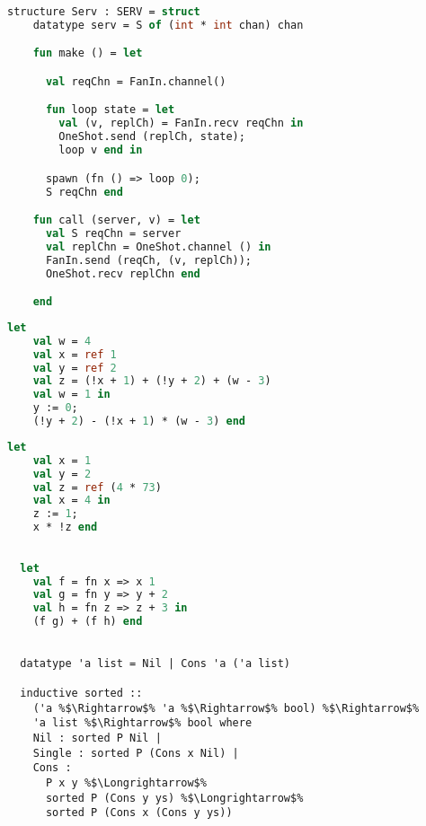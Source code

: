 \documentclass{article}
\begin{document}
\begin{lstlisting}[language=ML, style=codestyle1]
  structure Serv : SERV = struct 
    datatype serv = S of (int * int chan) chan 

    fun make () = let 

      val reqChn = FanIn.channel()

      fun loop state = let
        val (v, replCh) = FanIn.recv reqChn in 
        OneShot.send (replCh, state);
        loop v end in

      spawn (fn () => loop 0);
      S reqChn end 

    fun call (server, v) = let 
      val S reqChn = server
      val replChn = OneShot.channel () in 
      FanIn.send (reqCh, (v, replCh));
      OneShot.recv replChn end

    end
  \end{lstlisting}

\begin{lstlisting}[language=ML, style=codestyle1]
  let
    val w = 4
    val x = ref 1
    val y = ref 2
    val z = (!x + 1) + (!y + 2) + (w - 3)
    val w = 1 in
    y := 0;
    (!y + 2) - (!x + 1) * (w - 3) end
  \end{lstlisting}

\begin{lstlisting}[language=ML, style=codestyle1]
  let 
    val x = 1  
    val y = 2
    val z = ref (4 * 73)
    val x = 4 in 
    z := 1; 
    x * !z end
  \end{lstlisting}

\begin{lstlisting}[language=ML, style=codestyle1]

  let 
    val f = fn x => x 1
    val g = fn y => y + 2
    val h = fn z => z + 3 in 
    (f g) + (f h) end

\end{lstlisting}


\begin{lstlisting}[style=codestyle1, escapechar=\%]

  datatype 'a list = Nil | Cons 'a ('a list)

  inductive sorted ::
    ('a %$\Rightarrow$% 'a %$\Rightarrow$% bool) %$\Rightarrow$%
    'a list %$\Rightarrow$% bool where
    Nil : sorted P Nil |
    Single : sorted P (Cons x Nil) |
    Cons :
      P x y %$\Longrightarrow$%
      sorted P (Cons y ys) %$\Longrightarrow$%
      sorted P (Cons x (Cons y ys))
  \end{lstlisting}
\end{document}
